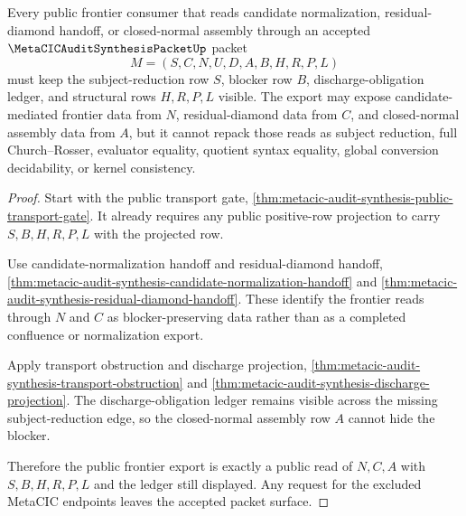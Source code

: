 \begin{theorem}
\label{thm:metacic-audit-synthesis-public-frontier-export}
Every public frontier consumer that reads candidate normalization, residual-diamond handoff, or closed-normal assembly through an accepted $\MetaCICAuditSynthesisPacketUp$ packet
$$
M=(S,C,N,U,D,A,B,H,R,P,L)
$$
must keep the subject-reduction row $S$, blocker row $B$, discharge-obligation ledger, and structural rows $H,R,P,L$ visible. The export may expose candidate-mediated frontier data from $N$, residual-diamond data from $C$, and closed-normal assembly data from $A$, but it cannot repack those reads as subject reduction, full Church--Rosser, evaluator equality, quotient syntax equality, global conversion decidability, or kernel consistency.
\end{theorem}
\begin{proof}
Start with the public transport gate, \autoref{thm:metacic-audit-synthesis-public-transport-gate}. It already requires any public positive-row projection to carry $S,B,H,R,P,L$ with the projected row.

Use candidate-normalization handoff and residual-diamond handoff, \autoref{thm:metacic-audit-synthesis-candidate-normalization-handoff} and \autoref{thm:metacic-audit-synthesis-residual-diamond-handoff}. These identify the frontier reads through $N$ and $C$ as blocker-preserving data rather than as a completed confluence or normalization export.

Apply transport obstruction and discharge projection, \autoref{thm:metacic-audit-synthesis-transport-obstruction} and \autoref{thm:metacic-audit-synthesis-discharge-projection}. The discharge-obligation ledger remains visible across the missing subject-reduction edge, so the closed-normal assembly row $A$ cannot hide the blocker.

Therefore the public frontier export is exactly a public read of $N,C,A$ with $S,B,H,R,P,L$ and the ledger still displayed. Any request for the excluded MetaCIC endpoints leaves the accepted packet surface.
\end{proof}

